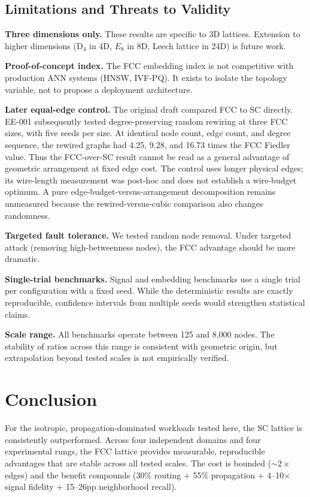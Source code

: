 \documentclass[11pt]{article}
\begin{document}
\subsection{Limitations and Threats to Validity}

\textbf{Three dimensions only.} These results are specific to 3D
lattices. Extension to higher dimensions (D$_4$ in 4D, $E_8$ in
8D, Leech lattice in 24D) is future work.

\textbf{Proof-of-concept index.} The FCC embedding index is not
competitive with production ANN systems (HNSW, IVF-PQ). It exists
to isolate the topology variable, not to propose a deployment
architecture.

\textbf{Later equal-edge control.} The original draft compared FCC to SC
directly. EE-001 subsequently tested degree-preserving random rewiring at
three FCC sizes, with five seeds per size. At identical node count, edge
count, and degree sequence, the rewired graphs had 4.25, 9.28, and
16.73 times the FCC Fiedler value. Thus the FCC-over-SC result cannot be
read as a general advantage of geometric arrangement at fixed edge cost.
The control uses longer physical edges; its wire-length measurement was
post-hoc and does not establish a wire-budget optimum. A pure
edge-budget-versus-arrangement decomposition remains unmeasured because
the rewired-versus-cubic comparison also changes randomness.

\textbf{Targeted fault tolerance.} We tested random node removal.
Under targeted attack (removing high-betweenness nodes), the FCC
advantage should be more dramatic.

\textbf{Single-trial benchmarks.} Signal and embedding benchmarks
use a single trial per configuration with a fixed seed. While the
deterministic results are exactly reproducible, confidence
intervals from multiple seeds would strengthen statistical claims.

\textbf{Scale range.} All benchmarks operate between 125 and
8{,}000 nodes. The stability of ratios across this range is
consistent with geometric origin, but extrapolation beyond tested
scales is not empirically verified.

\section{Conclusion}
\label{sec:conclusion}

For the isotropic, propagation-dominated workloads tested here, the
SC lattice is consistently outperformed. Across four independent
domains and four experimental rungs, the FCC lattice provides
measurable, reproducible advantages that are stable across all
tested scales. The cost is bounded (${\sim}2\times$ edges) and
the benefit compounds (30\% routing $+$ 55\% propagation $+$
4--10$\times$ signal fidelity $+$ 15--26pp neighborhood recall).
\end{document}
